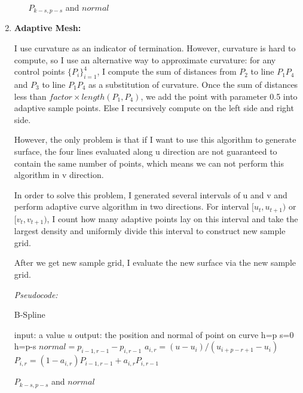 \documentclass[acmtog]{acmart}
\begin{document}
\begin{enumerate}
\begin{enumerate}
\begin{algorithm}
\begin{algorithmic}
				\RETURN $P_{k-s,p-s}$ and $normal$
			\end{algorithmic} 
		\end{algorithm}
	\end{enumerate}
	\item {\bf Adaptive Mesh:}
	\par I use curvature as an indicator of termination. However, curvature is hard to compute, so I use an alternative way to approximate curvature: for any control points $\{P_i\}_{i=1}^4$, I compute the sum of distances from $P_2$ to line $P_1P_4$ and $P_3$ to line $P_1P_4$ as a substitution of curvature. Once the sum of distances less than $factor\times length(P_1,P_4)$, we add the point with parameter 0.5 into adaptive sample points. Else I recursively compute on the left side and right side.
	\par However, the only problem is that if I want to use this algorithm to generate surface, the four lines evaluated along u direction are not guaranteed to contain the same number of points, which means we can not perform this algorithm in v direction.
	\par In order to solve this problem, I generated several intervals of u and v and perform adaptive curve algorithm in two directions. For interval $[u_t, u_{t+1})$ or $[v_t, v_{t+1})$, I count how many adaptive points lay on this interval and take the largest density and uniformly divide this interval to construct new sample grid.
	\par After we get new sample grid, I evaluate the new surface via the new sample grid.
	\par {\it Pseudocode:}
		\begin{algorithm}
			\caption{B-Spline} 
			\begin{algorithmic}
				\STATE input: a value $u$
				\STATE output: the position and normal of point on curve
				\IF{$u\in[u_k,u_{k+1})$ and $u\neq u_k$}
					\STATE h=p
					\STATE s=0
				\ENDIF
					\STATE h=p-s
				\ENDIF
							\STATE $normal= p_{i-1,r-1}-p_{i,r-1}$
						\ENDIF
						\STATE $a_{i,r}=(u-u_i)/(u_{i+p-r+1}-u_i)$
						\STATE $P_{i,r}=(1-a_{i,r})P_{i-1,r-1}+a_{i,r}P_{i,r-1}$
					\ENDFOR
				\ENDFOR
				
				\RETURN $P_{k-s,p-s}$ and $normal$
			\end{algorithmic} 
		\end{algorithm}
\end{enumerate}
\end{document}
